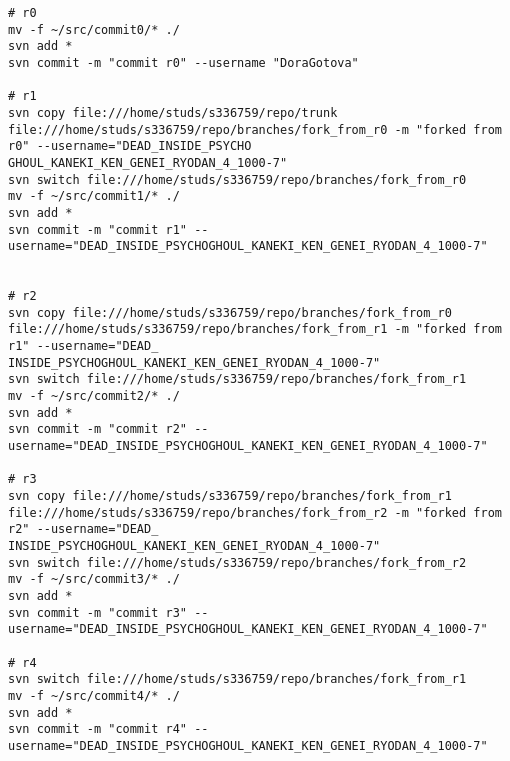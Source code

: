 
\tiny
\begin{verbatim}
# r0
mv -f ~/src/commit0/* ./
svn add *
svn commit -m "commit r0" --username "DoraGotova"

# r1
svn copy file:///home/studs/s336759/repo/trunk file:///home/studs/s336759/repo/branches/fork_from_r0 -m "forked from r0" --username="DEAD_INSIDE_PSYCHO
GHOUL_KANEKI_KEN_GENEI_RYODAN_4_1000-7"
svn switch file:///home/studs/s336759/repo/branches/fork_from_r0
mv -f ~/src/commit1/* ./
svn add *
svn commit -m "commit r1" --username="DEAD_INSIDE_PSYCHOGHOUL_KANEKI_KEN_GENEI_RYODAN_4_1000-7"


# r2
svn copy file:///home/studs/s336759/repo/branches/fork_from_r0 file:///home/studs/s336759/repo/branches/fork_from_r1 -m "forked from r1" --username="DEAD_
INSIDE_PSYCHOGHOUL_KANEKI_KEN_GENEI_RYODAN_4_1000-7"
svn switch file:///home/studs/s336759/repo/branches/fork_from_r1
mv -f ~/src/commit2/* ./
svn add *
svn commit -m "commit r2" --username="DEAD_INSIDE_PSYCHOGHOUL_KANEKI_KEN_GENEI_RYODAN_4_1000-7"

# r3
svn copy file:///home/studs/s336759/repo/branches/fork_from_r1 file:///home/studs/s336759/repo/branches/fork_from_r2 -m "forked from r2" --username="DEAD_
INSIDE_PSYCHOGHOUL_KANEKI_KEN_GENEI_RYODAN_4_1000-7"
svn switch file:///home/studs/s336759/repo/branches/fork_from_r2
mv -f ~/src/commit3/* ./
svn add *
svn commit -m "commit r3" --username="DEAD_INSIDE_PSYCHOGHOUL_KANEKI_KEN_GENEI_RYODAN_4_1000-7"

# r4
svn switch file:///home/studs/s336759/repo/branches/fork_from_r1
mv -f ~/src/commit4/* ./
svn add *
svn commit -m "commit r4" --username="DEAD_INSIDE_PSYCHOGHOUL_KANEKI_KEN_GENEI_RYODAN_4_1000-7"
\end{verbatim}
\normalsize
\newpage

